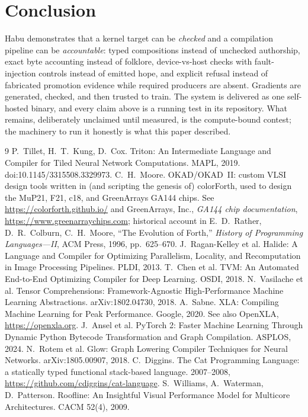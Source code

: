 \documentclass[11pt]{article}
\begin{document}
\section{Conclusion}
Habu demonstrates that a kernel target can be \emph{checked} and a
compilation pipeline can be \emph{accountable}: typed compositions
instead of unchecked authorship, exact byte accounting instead of
folklore, device-vs-host checks with fault-injection controls instead of
emitted hope, and explicit refusal instead of fabricated promotion
evidence while required producers are absent. Gradients are generated,
checked, and then trusted to train. The system is delivered as one self-hosted
binary, and every claim above is a running test in
its repository. What remains, deliberately unclaimed until measured, is the
compute-bound contest; the machinery to run it honestly is what this
paper described.

\begin{thebibliography}{9}
 P.~Tillet, H.~T.~Kung, D.~Cox. Triton: An Intermediate
Language and Compiler for Tiled Neural Network Computations. MAPL, 2019.
doi:10.1145/3315508.3329973.
 C.~H.~Moore. OKAD/OKAD~II: custom VLSI design tools
written in (and scripting the genesis of) colorForth, used to design the
MuP21, F21, c18, and GreenArrays GA144 chips.
See \url{https://colorforth.github.io/} and GreenArrays, Inc.,
\emph{GA144 chip documentation}, \url{https://www.greenarraychips.com};
historical account in E.~D.~Rather, D.~R.~Colburn, C.~H.~Moore, ``The
Evolution of Forth,'' \emph{History of Programming Languages---II},
ACM Press, 1996, pp.~625--670.
 J.~Ragan-Kelley et al. Halide: A Language and Compiler
for Optimizing Parallelism, Locality, and Recomputation in Image
Processing Pipelines. PLDI, 2013.
 T.~Chen et al. TVM: An Automated End-to-End Optimizing
Compiler for Deep Learning. OSDI, 2018.
 N.~Vasilache et al. Tensor Comprehensions:
Framework-Agnostic High-Performance Machine Learning Abstractions.
arXiv:1802.04730, 2018.
 A.~Sabne. XLA: Compiling Machine Learning for Peak
Performance. Google, 2020. See also OpenXLA,
\url{https://openxla.org}.
 J.~Ansel et al. PyTorch 2: Faster Machine Learning
Through Dynamic Python Bytecode Transformation and Graph Compilation.
ASPLOS, 2024.
 N.~Rotem et al. Glow: Graph Lowering Compiler Techniques
for Neural Networks. arXiv:1805.00907, 2018.
 C.~Diggins. The Cat Programming Language: a statically
typed functional stack-based language. 2007--2008,
\url{https://github.com/cdiggins/cat-language}.
 S.~Williams, A.~Waterman, D.~Patterson. Roofline: An
Insightful Visual Performance Model for Multicore Architectures.
CACM 52(4), 2009.
\end{thebibliography}
\end{document}
